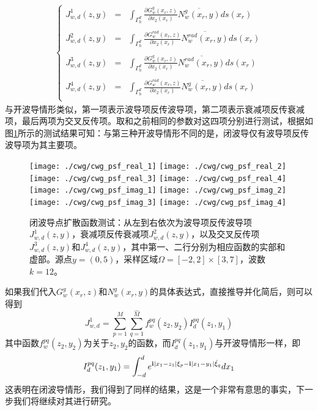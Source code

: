 \begin{eqnarray}
\left\{
\begin{array}{lll}
 J^1_{w,d}(z,y)&=&\int_{\Gamma_h^d}\frac{\partial G_w^g(x_r,z)}{\partial x_2(x_r)}\overline{N_w^g(x_r,y)}ds(x_r)\\
 & &\\
 J^2_{w,d}(z,y)&=&\int_{\Gamma_h^d}\frac{\partial G_w^{rad}(x_r,z)}{\partial x_2(x_r)}\overline{N_w^{rad}(x_r,y)}ds(x_r)\\
 & &\\
 J^3_{w,d}(z,y)&=&\int_{\Gamma_h^d}\frac{\partial G_w^g(x_r,z)}{\partial x_2(x_r)}\overline{N_w^{rad}(x_r,y)}ds(x_r)\\
 & &\\
 J^4_{w,d}(z,y)&=&\int_{\Gamma_h^d}\frac{\partial G_w^{rad}(x_r,z)}{\partial x_2(x_r)}\overline{N_w^g(x_r,y)}ds(x_r)\\
\end{array}
\right.
\end{eqnarray}
与开波导情形类似，第一项表示波导项反传波导项，第二项表示衰减项反传衰减项，最后两项为交叉反传项。取和之前相同的参数对这四项分别进行测试，根据如图\ref{cwg_psf_part}所示的测试结果可知：与第三种开波导情形不同的是，闭波导仅有波导项反传波导项为其主要项。
\begin{figure}[t]
	\centering
	\texttt{[image: ./cwg/cwg\_psf\_real\_1]}
	\texttt{[image: ./cwg/cwg\_psf\_real\_2]}
	\texttt{[image: ./cwg/cwg\_psf\_real\_3]}
	\texttt{[image: ./cwg/cwg\_psf\_real\_4]}
	\texttt{[image: ./cwg/cwg\_psf\_imag\_1]}
	\texttt{[image: ./cwg/cwg\_psf\_imag\_2]}
	\texttt{[image: ./cwg/cwg\_psf\_imag\_3]}
	\texttt{[image: ./cwg/cwg\_psf\_imag\_4]}
	\caption{闭波导点扩散函数测试：从左到右依次为波导项反传波导项$J^1_{w,d}(z,y)$，衰减项反传衰减项$J^2_{w,d}(z,y)$，以及交叉反传项$J^3_{w,d}(z,y)$和$J^4_{w,d}(z,y)$，其中第一、二行分别为相应函数的实部和虚部。源点$y=(0,5)$，采样区域$\Omega=[-2,2]\times[3,7]$，波数$k=12$。}\label{cwg_psf_part}
\end{figure}
如果我们代入$G_w^g(x_r,z)$和$N_w^g(x_r,y)$的具体表达式，直接推导并化简后，则可以得到
\begin{equation}
 J^1_{w,d}=\sum\limits_{p=1}^{M}\sum\limits_{q=1}^{\hat M}f^{pq}_w(z_2,y_2)I^{pq}_d(z_1,y_1)
\end{equation}
其中函数$f^{pq}_w(z_2,y_2)$为关于$z_2,y_2$的函数，而$I^{pq}_d(z_1,y_1)$与开波导情形一样，即
\begin{equation}
I^{pq}_d(z_1,y_1) =\int_{-d}^{d}e^{\mathbf{i}|x_1-z_1|\xi_p-\mathbf{i}|x_1-y_1|\hat\xi_q}dx_1
\end{equation}
这表明在闭波导情形，我们得到了同样的结果，这是一个非常有意思的事实，下一步我们将继续对其进行研究。

